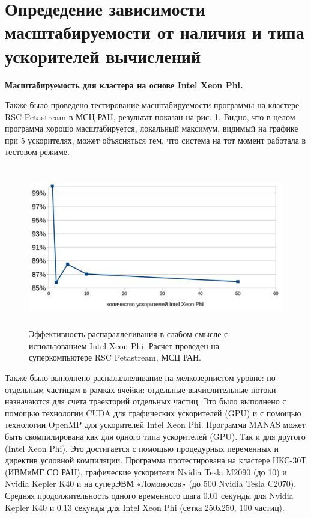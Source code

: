         
        \section{Опредедение зависимости масштабируемости от наличия и типа ускорителей вычислений}
        
        \textbf{Масштабируемость для кластера на основе Intel Xeon Phi.} 
        
       Также было проведено тестирование масштабируемости программы на кластере RSC Petastream в МСЦ РАН, результат показан на рис. \ref{phi100}. Видно, что в целом программа хорошо масштабируется, локальный максимум, видимый на графике при 5 ускорителях, может объясняться тем, что система на тот момент работала в тестовом режиме.
        
        \begin{figure}[htb]
        	\begin{center}
        		\includegraphics[height=7cm,keepaspectratio]{images/petastream_phi100.jpg}
        	\end{center}
        	\caption{Эффективность распараллеливания в слабом смысле с использованием Intel Xeon Phi. Расчет проведен на суперкомпьютере RSC Petastream, МСЦ РАН.}
        	\label{phi100}
        \end{figure}
        
        Также было выполнено распалаллеливание на мелкозернистом уровне: по отдельным частицам в рамках ячейки: отдельные вычислительные потоки назначаются для счета траекторий отдельных частиц. Это было выполнено с помощью технологии CUDA для графических ускорителей (GPU) и с помощью технологии OpenMP для ускорителей Intel Xeon Phi. Программа MANAS может быть скомпилирована как для одного типа ускорителей (GPU). Так и для другого (Intel Xeon Phi). Это достигается с помощью процедурных переменных и директив условной компиляции. Программа протестирована на кластере НКС-30Т (ИВМиМГ СО РАН), графические ускорители Nvidia Tesla M2090 (до 10) и Nvidia Kepler K40 и на суперЭВМ «Ломоносов»  (до 500 Nvidia Tesla C2070). Средняя продолжительность одного временного шага 0.01 секунды для  Nvidia Kepler K40 и 0.13 секунды для  Intel Xeon Phi (сетка 250х250, 100 частиц).
        
